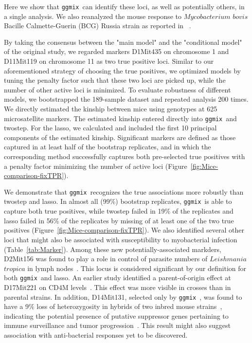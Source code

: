 \documentclass[12pt,letter]{article}\usepackage[]{graphicx}\usepackage[]{color}
\newcommand{\ggmix}{\texttt{ggmix}}
\begin{document}
Here we show that \ggmix ~can identify these loci, as well as potentially others, in a single analysis. We also reanalyzed the mouse response to $Mycobacterium$ $bovis$ Bacille Calmette-Guerin (BCG) Russia strain as reported in ~\citep{di2010strain}.

By taking the consensus between the "main model" and the "conditional model" of the original study, we regarded markers D1Mit435 on chromosome 1 and D11Mit119 on chromosome 11 as two true positive loci.
Similar to our aforementioned strategy of choosing the true positives, we optimized models by tuning the penalty factor such that these two loci are picked up, while the number of other active loci is minimized.
To evaluate robustness of different models, we bootstrapped the 189-sample dataset and repeated analysis 200 times.
We directly estimated the kinship between mice using genotypes at 625 microsatellite markers. The estimated kinship entered directly into \ggmix ~and twostep. For the lasso, we calculated and included the first 10 principal components of the estimated kinship.
Significant markers are defined as those captured in at least half of the bootstrap replicates, and in which the corresponding method successfully captures both pre-selected true positives with a penalty factor minimizing the number of active loci (Figure~\ref{fig:Mice-comparison-fixTPR}).

We demonstrate that \ggmix ~recognizes the true associations more robustly than twostep and lasso. In almost all (99\%) bootstrap replicates, \ggmix ~is able to capture both true positives, while twostep failed in 19\% of the replicates and lasso failed in 56\% of the replicates by missing of at least one of the two true positives (Figure~\ref{fig:Mice-comparison-fixTPR}).
We also identified several other loci that might also be associated with susceptibility to myobacterial infection (Table~\ref{tab:Marker}). Among these new potentially-associated markders, D2Mit156 was found to play a role in control of parasite numbers of $Leishmania$ $tropica$ in lymph nodes~\citep{sohrabi2013mapping}. This locus is considered significant by our definition for both \ggmix ~and lasso. An earlier study identified a parent-of-origin effect at D17Mit221 on CD4M levels~\citep{jackson1999multiple}. This effect was more visible in crosses than in parental strains. In addition, D14Mit131, selected only by \ggmix ~, was found to have a 9\% loss of heterozygosity in hybrids of two inbred mouse strains~\citep{c2000allelotype}, indicating the potential presence of putative suppressor genes pertaining to immune surveillance and tumor progression~\citep{lasko1991loss}. This result might also suggest association with anti-bacterial responses yet to be discovered.
\end{document}
